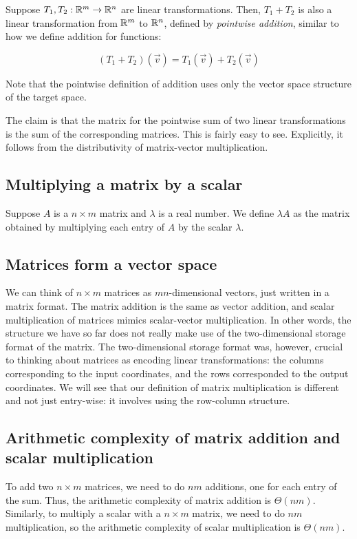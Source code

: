 \documentclass[10pt]{amsart}
\begin{document}
Suppose $T_1,T_2: \mathbb{R}^m \to \mathbb{R}^n$ are linear transformations. Then,
$T_1 + T_2$ is also a linear transformation from $\mathbb{R}^m$ to $\mathbb{R}^n$,
defined by {\em pointwise addition}, similar to how we define addition
for functions:

$$(T_1 + T_2)(\vec{v}) = T_1(\vec{v}) + T_2(\vec{v})$$

Note that the pointwise definition of addition uses only the vector
space structure of the target space.

The claim is that the matrix for the pointwise sum of two linear
transformations is the sum of the corresponding matrices. This is
fairly easy to see. Explicitly, it follows from the distributivity of
matrix-vector multiplication.

\subsection{Multiplying a matrix by a scalar}

Suppose $A$ is a $n \times m$ matrix and $\lambda$ is a real
number. We define $\lambda A$ as the matrix obtained by multiplying
each entry of $A$ by the scalar $\lambda$.

\subsection{Matrices form a vector space}

We can think of $n \times m$ matrices as $mn$-dimensional vectors,
just written in a matrix format. The matrix addition is the same as
vector addition, and scalar multiplication of matrices mimics
scalar-vector multiplication. In other words, the structure we have so
far does not really make use of the two-dimensional storage format of
the matrix. The two-dimensional storage format was, however, crucial
to thinking about matrices as encoding linear transformations: the
columns corresponding to the input coordinates, and the rows
corresponded to the output coordinates. We will see that our
definition of matrix multiplication is different and not just
entry-wise: it involves using the row-column structure.

\subsection{Arithmetic complexity of matrix addition and scalar multiplication}

To add two $n \times m$ matrices, we need to do $nm$ additions, one
for each entry of the sum. Thus, the arithmetic complexity of matrix
addition is $\Theta(nm)$. Similarly, to multiply a scalar with a $n
\times m$ matrix, we need to do $nm$ multiplication, so the arithmetic
complexity of scalar multiplication is $\Theta(nm)$.
\end{document}
